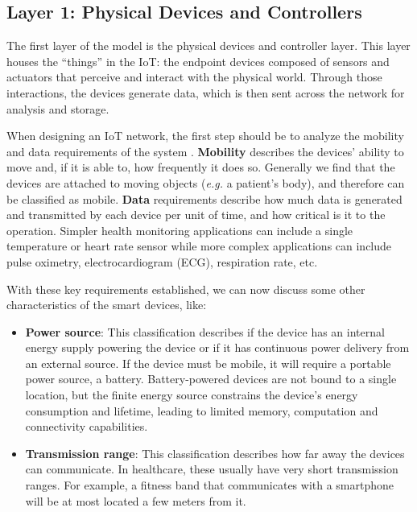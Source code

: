 \subsection{Layer 1: Physical Devices and Controllers}
\label{sec:iot-model-layer1}

The first layer of the model is the physical devices and controller layer. This layer houses the ``things'' in the \acl{IoT}: the endpoint devices composed of sensors and actuators that perceive and interact with the physical world. Through those interactions, the devices generate data, which is then sent across the network for analysis and storage. \bigskip

When designing an \acs {IoT} network, the first step should be to analyze the mobility and data requirements of the system \cite{10.5555/3161403}. \textbf{Mobility} describes the devices' ability to move and, if it is able to, how frequently it does so. Generally we find that the devices are attached to moving objects (\textit{e.g.} a patient's body), and therefore can be classified as mobile. \textbf{Data} requirements describe how much data is generated and transmitted by each device per unit of time, and how critical is it to the operation. Simpler health monitoring applications can include a single temperature or heart rate sensor while more complex applications can include pulse oximetry, electrocardiogram (\acs{ECG}), respiration rate, etc. \bigskip

With these key requirements established, we can now discuss some other characteristics of the smart devices, like:

\begin{itemize}
    \item \textbf{Power source}: This classification describes if the device has an internal energy supply powering the device or if it has continuous power delivery from an external source. If the device must be mobile, it will require a portable power source, a battery. Battery-powered devices are not bound to a single location, but the finite energy source constrains the device's energy consumption and lifetime, leading to limited memory, computation and connectivity capabilities. 
    \item \textbf{Transmission range}: This classification describes how far away the devices can communicate. In healthcare, these usually have very short transmission ranges. For example, a fitness band that communicates with a smartphone will be at most located a few meters from it.
\end{itemize}

